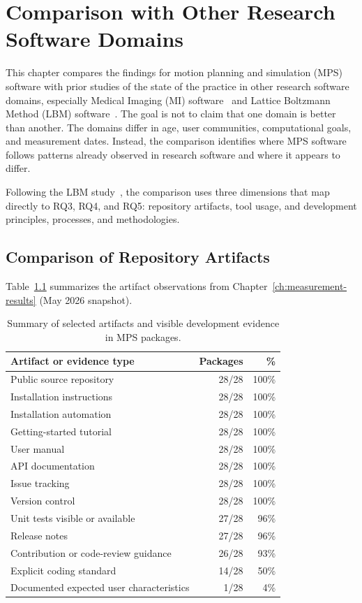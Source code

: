 \chapter{Comparison with Other Research Software Domains}
\label{ch:comparison-research-software}

This chapter compares the findings for motion planning and simulation (MPS) software with prior studies of the state of the practice in other research software domains, especially Medical Imaging (MI) software~\citep{Smith2024MI} and Lattice Boltzmann Method (LBM) software~\citep{Smith2024LBM}. The goal is not to claim that one domain is better than another. The domains differ in age, user communities, computational goals, and measurement dates. Instead, the comparison identifies where MPS software follows patterns already observed in research software and where it appears to differ.

Following the LBM study~\citep{Smith2024LBM}, the comparison uses three dimensions that map directly to RQ3, RQ4, and RQ5: repository artifacts, tool usage, and development principles, processes, and methodologies.

\section{Comparison of Repository Artifacts}
\label{sec:comparison-artifacts}

Table~\ref{tab:mps-artifact-comparison-summary} summarizes the artifact observations from Chapter~\ref{ch:measurement-results} (May 2026 snapshot).

\begin{table}[H]
\centering
\caption{Summary of selected artifacts and visible development evidence in MPS packages.}
\label{tab:mps-artifact-comparison-summary}
\begin{tabular}{@{}lrr@{}}
\toprule
\textbf{Artifact or evidence type} & \textbf{Packages} & \textbf{\%} \\
\midrule
Public source repository & 28/28 & 100\% \\
Installation instructions & 28/28 & 100\% \\
Installation automation & 28/28 & 100\% \\
Getting-started tutorial & 28/28 & 100\% \\
User manual & 28/28 & 100\% \\
API documentation & 28/28 & 100\% \\
Issue tracking & 28/28 & 100\% \\
Version control & 28/28 & 100\% \\
Unit tests visible or available & 27/28 & 96\% \\
Release notes & 27/28 & 96\% \\
Contribution or code-review guidance & 26/28 & 93\% \\
Explicit coding standard & 14/28 & 50\% \\
Documented expected user characteristics & 1/28 & 4\% \\
\bottomrule
\end{tabular}
\end{table}

